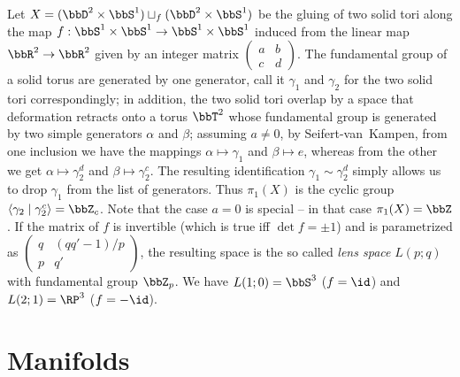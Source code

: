 \begin{example}\label{example Lens space bredon}
    Let $X=(\bbD^2\times \bbS^1)\sqcup_f (\bbD^2\times \bbS^1)$ be the gluing of two solid tori along the map $f:\bbS^1\times \bbS^1\to \bbS^1\times \bbS^1$ induced from the linear map $\bbR^2\to\bbR^2$ given by an integer matrix $\begin{pmatrix}a&b\\c&d\end{pmatrix}$. The fundamental group of a solid torus are generated by one generator, call it $\gamma_1$ and $\gamma_2$ for the two solid tori correspondingly; in addition, the two solid tori overlap by a space that deformation retracts onto a torus $\bbT^2$ whose fundamental group is generated by two simple generators $\alpha$ and $\beta$; assuming $a\neq 0$, by Seifert-van~Kampen, from one inclusion we have the mappings $\alpha\mapsto\gamma_1$ and $\beta\mapsto e$, whereas from the other we get $\alpha\mapsto \gamma_2^d$ and $\beta\mapsto \gamma_2^c$. The resulting identification $\gamma_1\sim \gamma_2^d$ simply allows us to drop $\gamma_1$ from the list of generators. Thus $\pi_1(X)$ is the cyclic group $\langle \gamma_2\mid \gamma_2^c\rangle=\bbZ_c$. Note that the case $a=0$ is special -- in that case $\pi_1(X)=\bbZ$. If the matrix of $f$ is invertible (which is true iff $\det f=\pm1$) and is parametrized as $\begin{pmatrix}q&(qq'-1)/p\\p&q'\end{pmatrix}$, the resulting space is the so called \emph{lens space} $L(p;q)$ with fundamental group $\bbZ_p$. We have $L(1;0)=\bbS^3$ ($f=\id$) and $L(2;1)=\RP^3$ ($f=-\id$).
\end{example}





\clearpage

\chapter{Manifolds}

